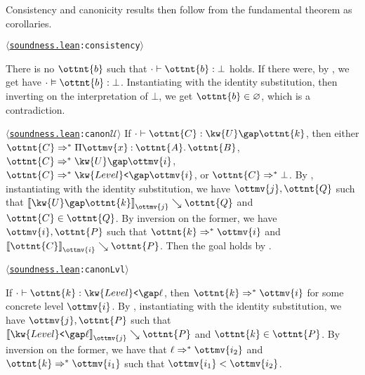 \documentclass[a4paper,UKenglish,cleveref,autoref,thm-restate]{lipics-v2021}
\newcommand{\repo}{https://github.com/ionathanch/TTBFL}
\newcommand{\thmref}[2]{%
  $\langle$\href{\repo/tree/main/src/#1}{\texttt{#1}}\texttt{:#2}$\rangle$%
}
\begin{document}
Consistency and canonicity results then follow from the fundamental theorem as corollaries.

\begin{corollary}[Consistency] \thmref{soundness.lean}{consistency}
  There is no $\ottnt{b}$ such that $  \cdot   \vdash  \ottnt{b}  \mathrel{:}   \bot  $ holds.
  If there were, by ,
  we get have $  \cdot   \vDash  \ottnt{b}  :   \bot  $.
  Instantiating with the identity substitution,
  then inverting on the interpretation of $ \bot $,
  we get $ \ottnt{b}  \in   \varnothing  $, which is a contradiction.
\end{corollary}

\begin{corollary} \thmref{soundness.lean}{canon$\mathcal{U}$} \label{lem:canon:univ}
  If $  \cdot   \vdash  \ottnt{C}  \mathrel{:}   \kw{U} \gap  \ottnt{k}  $,
  then either $ \ottnt{C}  \Rightarrow^\ast   \Pi  \ottmv{x}  \mathbin{:}  \ottnt{A}  \mathpunct{.}  \ottnt{B}  $, $ \ottnt{C}  \Rightarrow^\ast   \kw{U} \gap   \ottmv{i}   $, $ \ottnt{C}  \Rightarrow^\ast   \kw{Level}\texttt{<} \gap   \ottmv{i}   $, or $ \ottnt{C}  \Rightarrow^\ast   \bot  $.
  By ,
  instantiating with the identity substitution,
  we have $\ottmv{j}, \ottnt{Q}$ such that $ \mathopen{\llbracket}   \kw{U} \gap  \ottnt{k}   \mathclose{\rrbracket}_{ \ottmv{j} } \searrow  \ottnt{Q} $ and $ \ottnt{C}  \in  \ottnt{Q} $.
  By inversion on the former,
  we have $\ottmv{i}, \ottnt{P}$ such that $ \ottnt{k}  \Rightarrow^\ast   \ottmv{i}  $ and $ \mathopen{\llbracket}  \ottnt{C}  \mathclose{\rrbracket}_{ \ottmv{i} } \searrow  \ottnt{P} $.
  Then the goal holds by .
\end{corollary}

\begin{corollary} \thmref{soundness.lean}{canonLvl}
  If $  \cdot   \vdash  \ottnt{k}  \mathrel{:}   \kw{Level}\texttt{<} \gap  \ell  $,
  then $ \ottnt{k}  \Rightarrow^\ast   \ottmv{i}  $ for some concrete level $\ottmv{i}$.
  By ,
  instantiating with the identity substitution,
  we have $\ottmv{j}, \ottnt{P}$ such that $ \mathopen{\llbracket}   \kw{Level}\texttt{<} \gap  \ell   \mathclose{\rrbracket}_{ \ottmv{j} } \searrow  \ottnt{P} $ and $ \ottnt{k}  \in  \ottnt{P} $.
  By inversion on the former,
  we have that $ \ell  \Rightarrow^\ast   \ottmv{i_{{\mathrm{2}}}}  $ and $ \ottnt{k}  \Rightarrow^\ast   \ottmv{i_{{\mathrm{1}}}}  $ such that $ \ottmv{i_{{\mathrm{1}}}}  <  \ottmv{i_{{\mathrm{2}}}} $.
\end{corollary}
\end{document}
